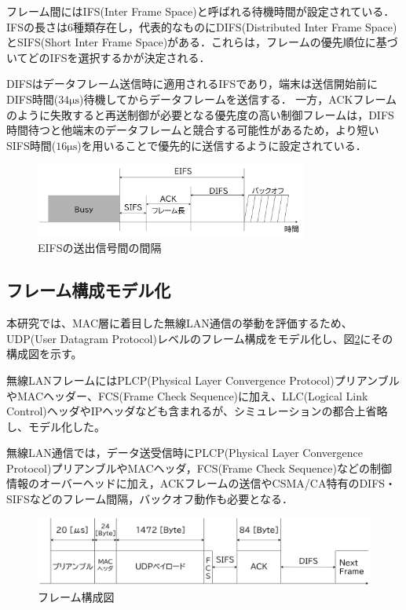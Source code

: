 \documentclass[a4paper,10pt]{ltjsarticle}
\begin{document}
フレーム間にはIFS(Inter Frame Space)と呼ばれる待機時間が設定されている．IFSの長さは6種類存在し，代表的なものにDIFS(Distributed Inter Frame Space)とSIFS(Short Inter Frame Space)がある．これらは，フレームの優先順位に基づいてどのIFSを選択するかが決定される．

DIFSはデータフレーム送信時に適用されるIFSであり，端末は送信開始前にDIFS時間($34\mathrm{\mu s}$)待機してからデータフレームを送信する．
一方，ACKフレームのように失敗すると再送制御が必要となる優先度の高い制御フレームは，DIFS時間待つと他端末のデータフレームと競合する可能性があるため，より短いSIFS時間($16\mathrm{\mu s}$)を用いることで優先的に送信するように設定されている．

\begin{figure}[H]
  \centering
  \includegraphics[width=0.8\textwidth]{./assets/EIFS.png}
  \caption{EIFSの送出信号間の間隔}
  \label{eifs}
\end{figure}


\subsection{フレーム構成モデル化}

本研究では、MAC層に着目した無線LAN通信の挙動を評価するため、UDP(User Datagram Protocol)レベルのフレーム構成をモデル化し、図\ref{packet}にその構成図を示す。

無線LANフレームにはPLCP(Physical Layer Convergence Protocol)プリアンブルやMACヘッダー、FCS(Frame Check Sequence)に加え、LLC(Logical Link Control)ヘッダやIPヘッダなども含まれるが、シミュレーションの都合上省略し、モデル化した。

無線LAN通信では，データ送受信時にPLCP(Physical Layer Convergence Protocol)プリアンブルやMACヘッダ，FCS(Frame Check Sequence)などの制御情報のオーバーヘッドに加え，ACKフレームの送信やCSMA/CA特有のDIFS・SIFSなどのフレーム間隔，バックオフ動作も必要となる．

\begin{figure}[H]
  \centering
  \includegraphics[width=1\columnwidth]{./assets/packet.png}
  \caption{フレーム構成図}
  \label{packet}
\end{figure}
\end{document}
